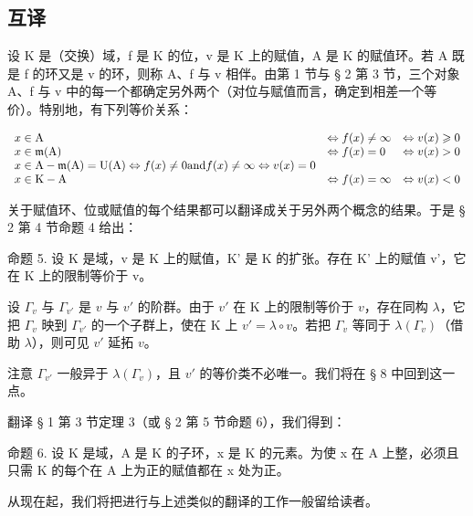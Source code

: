 \subsection{互译}

设 K 是（交换）域，f 是 K 的位，v 是 K 上的赋值，A 是 K 的赋值环。若 A 既是 f 的环又是 v 的环，则称 A、f 与 v 相伴。由第 1 节与 § 2 第 3 节，三个对象 A、f 与 v 中的每一个都确定另外两个（对位与赋值而言，确定到相差一个等价）。特别地，有下列等价关系：

\[
\begin{array}{l l l l} x \in \mathrm{A} & \Leftrightarrow f (x) \neq \infty & \Leftrightarrow v (x) \geqslant 0 \\ x \in \mathfrak {m} (\mathrm{A}) & \Leftrightarrow f (x) = 0 & \Leftrightarrow v (x) > 0 \\ x \in \mathrm{A} - \mathfrak {m} (\mathrm{A}) = \mathrm{U} (\mathrm{A}) \Leftrightarrow f (x) \neq 0 \text {and} f (x) \neq \infty \Leftrightarrow v (x) = 0 \\ x \in \mathrm{K} - \mathrm{A} & \Leftrightarrow f (x) = \infty & \Leftrightarrow v (x) <   0 \end{array}
\]

关于赋值环、位或赋值的每个结果都可以翻译成关于另外两个概念的结果。于是 § 2 第 4 节命题 4 给出：

命题 5. 设 K 是域，v 是 K 上的赋值，K' 是 K 的扩张。存在 K' 上的赋值 v'，它在 K 上的限制等价于 v。

设 \(\Gamma_v\) 与 \(\Gamma_{v'}\) 是 \(v\) 与 \(v'\) 的阶群。由于 \(v'\) 在 K 上的限制等价于 \(v\)，存在同构 \(\lambda\)，它把 \(\Gamma_v\) 映到 \(\Gamma_{v'}\) 的一个子群上，使在 K 上 \(v' = \lambda \circ v\)。若把 \(\Gamma_v\) 等同于 \(\lambda(\Gamma_v)\)（借助 \(\lambda\)），则可见 \(v'\) 延拓 \(v\)。

注意 \(\Gamma_{v'}\) 一般异于 \(\lambda(\Gamma_v)\)，且 \(v'\) 的等价类不必唯一。我们将在 § 8 中回到这一点。

翻译 § 1 第 3 节定理 3（或 § 2 第 5 节命题 6），我们得到：

命题 6. 设 K 是域，A 是 K 的子环，x 是 K 的元素。为使 x 在 A 上整，必须且只需 K 的每个在 A 上为正的赋值都在 x 处为正。

从现在起，我们将把进行与上述类似的翻译的工作一般留给读者。

